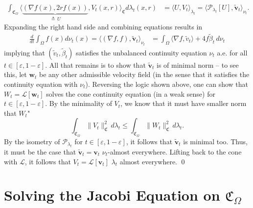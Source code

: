 \documentclass[11pt]{article}
\begin{document}
\begin{align*}
    \int_{\mathfrak{C}_\Omega} \Big\langle \underbrace{(\nabla f(x), 2rf(x))}_{\triangleq\, U},  V_t(x,r) \Big\rangle_\mathfrak{C} d\lambda_t(x,r) &= \Big\langle U, V_t \Big\rangle_{\lambda_t}= \langle \mathcal{P}_{\lambda_t}[U], \tilde{\mathbf{v}}_t\rangle_{\nu_t}. 
\end{align*}
Expanding the right hand side and combining equations results in 
\begin{align*}
    \frac{d}{dt}\int_{\Omega}f(x)d\nu_t(x) = \Big\langle \left( \nabla f, f \right) , \tilde{\mathbf{v}}_t\Big\rangle_{\nu_t} &= \int_\Omega \langle \nabla f, \tilde v_t\rangle + 4f\tilde\beta_t \, d\nu_t
\end{align*}
implying that $(\tilde v_t, \tilde \beta_t)$ satisfies the unbalanced continuity equation $\nu_t$ a.e. for all $t \in [\varepsilon, 1- \varepsilon]$. All that remains is to show that $\tilde{\mathbf{v}}_t$ is of minimal norm -- to see this, let $\mathbf{w}_t$ be any other admissible velocity field (in the sense that it satisfies the continuity equation with $\nu_t$). Reversing the logic shown above, one can show that $W_t  = \mathcal{L}[\mathbf{w}_t]$ solves the cone continuity equation (in a weak sense) for $t \in [\varepsilon, 1-\varepsilon]$. By the minimality of $V_t$, we know that it must have smaller norm that $W_t$"
\[\int_{\mathfrak{C}_\Omega}\|V_t\|^2_\mathfrak{C}\, d\lambda_t \leq \int_{\mathfrak{C}_\Omega}\|W_t\|_{\mathfrak{C}}^2\, d\lambda_t.\]
By the isometry of $\mathcal{P}_{\lambda_t}$ for $t \in [\varepsilon, 1 - \varepsilon]$, it follows that $\tilde{\mathbf{v}}_t$ is minimal too. Thus, it must be the case that $\tilde{\mathbf{v}}_t = \mathbf{v}_t$ $\nu_t$-almost everywhere. Lifting back to the cone with $\mathcal{L}$, it follows that $V_t = \mathcal{L}[\mathbf{v}_t]$ $\lambda_t$ almost everywhere.
\qed{}

\section{Solving the Jacobi Equation on $\mathfrak{C}_\Omega$} \label{sec: solving the jacobi equation}
\end{document}
